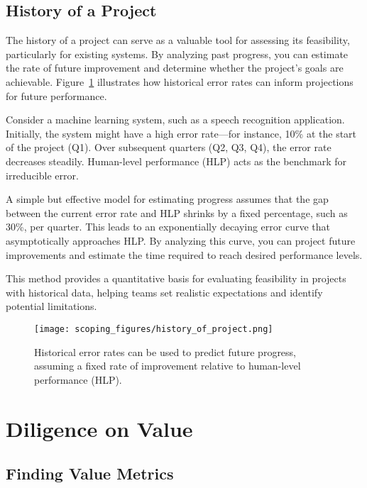 \documentclass[12pt,openany]{book}
\begin{document}
\subsection{History of a Project}

The history of a project can serve as a valuable tool for assessing its feasibility, particularly for existing systems. By analyzing past progress, you can estimate the rate of future improvement and determine whether the project’s goals are achievable. Figure~\ref{fig:history_of_project} illustrates how historical error rates can inform projections for future performance. \newline

Consider a machine learning system, such as a speech recognition application. Initially, the system might have a high error rate—for instance, 10\% at the start of the project (Q1). Over subsequent quarters (Q2, Q3, Q4), the error rate decreases steadily. Human-level performance (HLP) acts as the benchmark for irreducible error. \newline

A simple but effective model for estimating progress assumes that the gap between the current error rate and HLP shrinks by a fixed percentage, such as 30\%, per quarter. This leads to an exponentially decaying error curve that asymptotically approaches HLP. By analyzing this curve, you can project future improvements and estimate the time required to reach desired performance levels. \newline

This method provides a quantitative basis for evaluating feasibility in projects with historical data, helping teams set realistic expectations and identify potential limitations. \newline

\begin{figure}[H]
    \centering
    \texttt{[image: scoping\_figures/history\_of\_project.png]}
    \caption{Historical error rates can be used to predict future progress, assuming a fixed rate of improvement relative to human-level performance (HLP).}
    \label{fig:history_of_project}
\end{figure}


\section{Diligence on Value}

\subsection{Finding Value Metrics}
\end{document}
